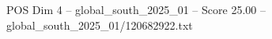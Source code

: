 \begin{textsample}{POS Dim 4 – global\_south\_2025\_01 – Score 25.00 – global\_south\_2025\_01/120682922.txt}
\end{textsample}
